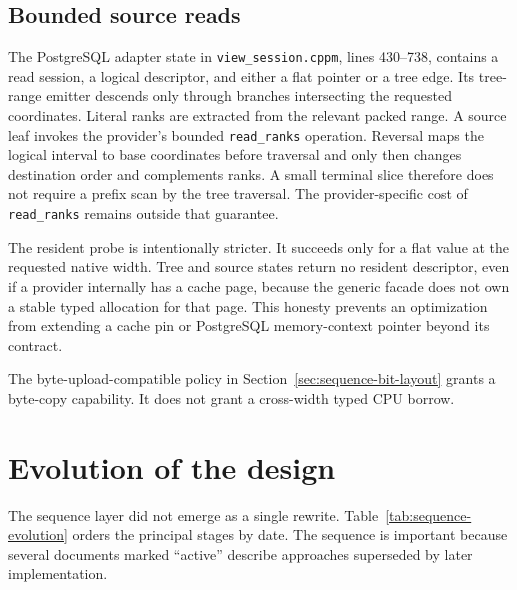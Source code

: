 \subsection{Bounded source reads}

The PostgreSQL adapter state in \texttt{view\_session.cppm}, lines 430--738,
contains a read session, a logical descriptor, and either a flat pointer or a
tree edge.  Its tree-range emitter descends only through branches intersecting
the requested coordinates.  Literal ranks are extracted from the relevant
packed range.  A source leaf invokes the provider's bounded
\texttt{read\_ranks} operation.  Reversal maps the logical interval to base
coordinates before traversal and only then changes destination order and
complements ranks.  A small terminal slice therefore does not require a
prefix scan by the tree traversal.  The provider-specific cost of
\texttt{read\_ranks} remains outside that guarantee.

The resident probe is intentionally stricter.  It succeeds only for a flat
value at the requested native width.  Tree and source states return no
resident descriptor, even if a provider internally has a cache page, because
the generic facade does not own a stable typed allocation for that page.
This honesty prevents an optimization from extending a cache pin or
PostgreSQL memory-context pointer beyond its contract.

The byte-upload-compatible policy in
Section~\ref{sec:sequence-bit-layout} grants a byte-copy capability.  It does
not grant a cross-width typed CPU borrow.

\section{Evolution of the design}
\label{sec:sequence-abstraction-evolution}

The sequence layer did not emerge as a single rewrite.
Table~\ref{tab:sequence-evolution} orders the principal stages by date.  The
sequence is important because several documents marked ``active'' describe
approaches superseded by later implementation.

